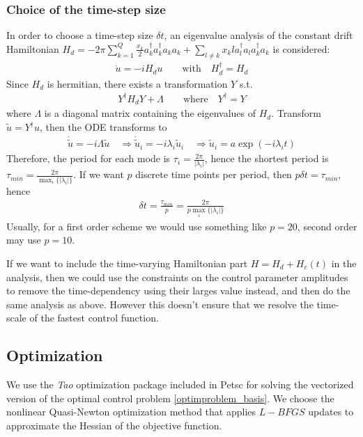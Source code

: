 \documentclass[letterpaper]{article}
\begin{document}
    \subsubsection{Choice of the time-step size}
    In order to choose a time-step size $\delta t$, an eigenvalue analysis of
    the constant drift Hamiltonian $H_d =  -2\pi \sum_{k=1}^Q \frac{x_k}{2}
    a_k^{\dagger}a_k^{\dagger}a_ka_k + \sum_{l\neq k} x_kl a_l^{\dagger}a_l
    a_k^{\dagger}a_k$ is considered:
       \begin{align*}  
         \dot u = -i H_d u \qquad \text{with} \quad H_d^{\dagger}  = H_d
       \end{align*} 
       Since $H_d$ is hermitian, there exists a transformation $Y$ s.t. 
       \begin{align*}
         Y^{\dagger}H_d Y + \Lambda \qquad  \text{where} \quad Y^{\dagger} = Y
       \end{align*}
       where $\Lambda$ is a diagonal matrix containing the eigenvalues of $H_d$.
       Transform $\tilde u = Y^{\dagger} u$, then the ODE transforms to 
       \begin{align*}
         \dot \tilde u = -i \Lambda \tilde u \quad \Rightarrow \dot \tilde u_i =
         -i\lambda_i \tilde u_i \quad \Rightarrow \tilde u_i = a
         \exp(-i\lambda_i t)
       \end{align*}
       Therefore, the period for each mode is $\tau_i =
       \frac{2\pi}{|\lambda_i|}$, hence the shortest period is $\tau_{min} =
       \frac{2\pi}{\max_i\{|\lambda_i|\}}$. If we want $p$ discrete time points
       per period, then $p\delta t = \tau_{min}$, hence 
       \begin{align*}
         \delta t = \frac{\tau_{min}}{p} = \frac{2\pi}{p\max_i\{|\lambda_i|\}}
       \end{align*}
       Usually, for a first order scheme we would use something like $p=20$,
       second order may use $p=10$. 

       If we want to include the time-varying Hamiltonian part $H = H_d +
       H_c(t)$ in the analysis, then we could use the constraints on the control
       parameter amplitudes to remove the time-dependency using their larges
       value instead, and then do the same analysis as above. However this
       doesn't ensure that we resolve the time-scale of the fastest control
       function. 

  \subsection{Optimization}
    We use the \textit{Tao} optimization package included in Petsc for solving
    the vectorized version of the optimal control problem
    \eqref{optimproblem_basis}. We choose the nonlinear Quasi-Newton
    optimization method that applies $L-BFGS$ updates to approximate the Hessian
    of the objective function. 
\end{document}
